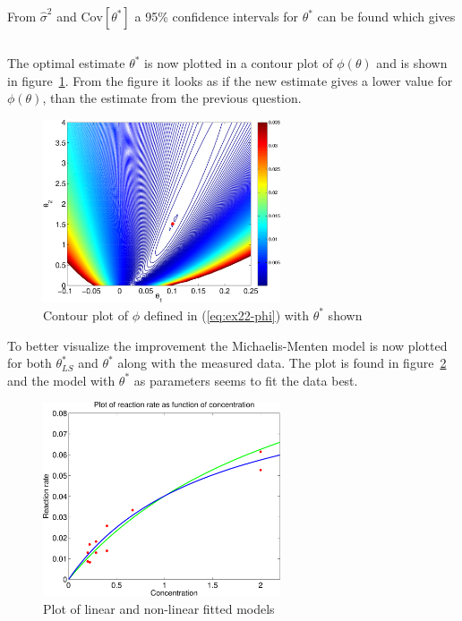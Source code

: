 From $\hat{\sigma}^2$ and $\text{Cov}[\theta^*]$ a 95\% confidence intervals for $\theta^*$ can be found which gives

\begin{equation*}
    
\end{equation*}

The optimal estimate $\theta^*$ is now plotted in a contour plot of $\phi(\theta)$ and is shown in figure~\ref{fig:ex22-contour-marquardt}. From the figure it looks as if the new estimate gives a lower value for $\phi(\theta)$, than the estimate from the previous question. 

\begin{figure}[ht]
    \centering
    \includegraphics[width=70mm]{../media/ex22-contour-marquardt.pdf}
    \caption{Contour plot of $\phi$ defined in (\ref{eq:ex22-phi}) with $\theta^*$ shown}
    \label{fig:ex22-contour-marquardt}
\end{figure}

To better visualize the improvement the Michaelis-Menten model is now plotted for both $\theta_{LS}^*$ and $\theta^*$ along with the measured data. The plot is found in figure~\ref{fig:ex22-models} and the model with $\theta^*$ as parameters seems to fit the data best.

\begin{figure}[ht]
    \centering
    \includegraphics[width=70mm]{../media/ex22-models-with-data.pdf}
    \caption{Plot of linear and non-linear fitted models}
    \label{fig:ex22-models}
\end{figure}


